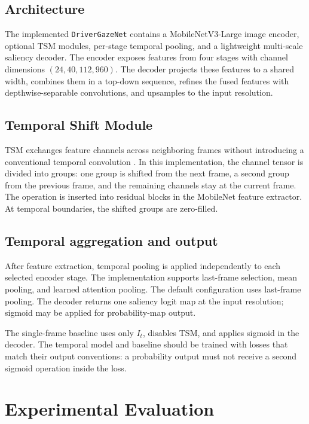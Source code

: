 \documentclass[10pt,twocolumn,letterpaper]{article}
\begin{document}
\subsection{Architecture}

The implemented \texttt{DriverGazeNet} contains a MobileNetV3-Large image
encoder, optional TSM modules, per-stage temporal pooling, and a lightweight
multi-scale saliency decoder. The encoder exposes features from four stages
with channel dimensions \((24, 40, 112, 960)\). The decoder projects these
features to a shared width, combines them in a top-down sequence, refines the
fused features with depthwise-separable convolutions, and upsamples to the
input resolution.

\subsection{Temporal Shift Module}

TSM exchanges feature channels across neighboring frames without introducing
a conventional temporal convolution \cite{lin2019tsm}. In this
implementation, the channel tensor is divided into groups: one group is
shifted from the next frame, a second group from the previous frame, and the
remaining channels stay at the current frame. The operation is inserted into
residual blocks in the MobileNet feature extractor. At temporal boundaries,
the shifted groups are zero-filled.

\subsection{Temporal aggregation and output}

After feature extraction, temporal pooling is applied independently to each
selected encoder stage. The implementation supports last-frame selection,
mean pooling, and learned attention pooling. The default configuration uses
last-frame pooling. The decoder returns one saliency logit map at the input
resolution; sigmoid may be applied for probability-map output.

The single-frame baseline uses only \(I_t\), disables TSM, and applies sigmoid
in the decoder. The temporal model and baseline should be trained with losses
that match their output conventions: a probability output must not receive a
second sigmoid operation inside the loss.

\section{Experimental Evaluation}
\label{sec:experiments}
\end{document}
